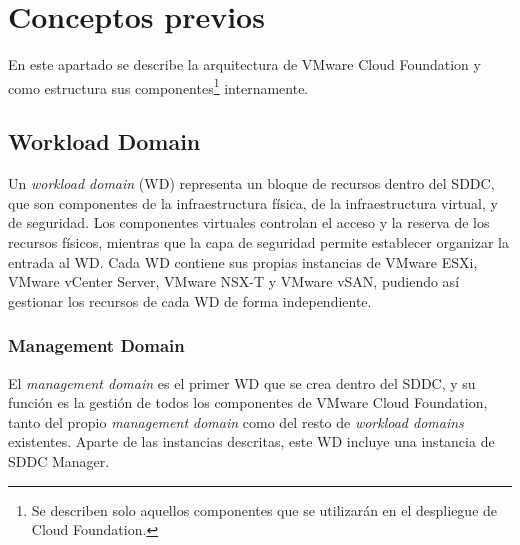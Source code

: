 \section{Conceptos previos}
En este apartado se describe la arquitectura de VMware Cloud Foundation y como estructura sus componentes\footnote{Se describen solo aquellos componentes que se utilizarán en el despliegue de Cloud Foundation.} internamente.

\subsection{Workload Domain}
Un \textit{workload domain} (WD) representa un bloque de recursos dentro del SDDC, que son componentes de la infraestructura física, de la infraestructura virtual, y de seguridad. Los componentes virtuales controlan el acceso y la reserva de los recursos físicos, mientras que la capa de seguridad permite establecer organizar la entrada al WD. Cada WD contiene sus propias instancias de VMware ESXi, VMware vCenter Server, VMware NSX-T y VMware vSAN, pudiendo así gestionar los recursos de cada WD de forma independiente.

\subsubsection{Management Domain}
\label{subsubsec:domainManagement}
El \textit{management domain} es el primer WD que se crea dentro del SDDC, y su función es la gestión de todos los componentes de VMware Cloud Foundation, tanto del propio \textit{management domain} como del resto de \textit{workload domains} existentes. Aparte de las instancias descritas, este WD incluye una instancia de SDDC Manager.

